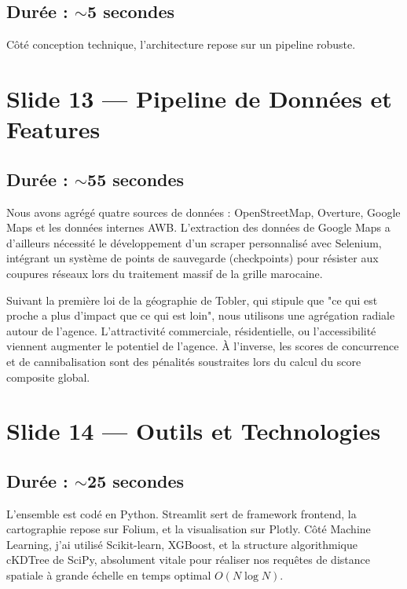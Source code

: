 \documentclass[11pt,a4paper]{article}
\begin{document}
\subsection{Durée : $\sim$5 secondes}
Côté conception technique, l'architecture repose sur un pipeline robuste.

\section{Slide 13 --- Pipeline de Données et Features}
\subsection{Durée : $\sim$55 secondes}
Nous avons agrégé quatre sources de données : OpenStreetMap, Overture, Google Maps et les données internes AWB. L'extraction des données de Google Maps a d'ailleurs nécessité le développement d'un scraper personnalisé avec Selenium, intégrant un système de points de sauvegarde (checkpoints) pour résister aux coupures réseaux lors du traitement massif de la grille marocaine.

Suivant la première loi de la géographie de Tobler, qui stipule que "ce qui est proche a plus d'impact que ce qui est loin", nous utilisons une agrégation radiale autour de l'agence. L'attractivité commerciale, résidentielle, ou l'accessibilité viennent augmenter le potentiel de l'agence. À l'inverse, les scores de concurrence et de cannibalisation sont des pénalités soustraites lors du calcul du score composite global.

\section{Slide 14 --- Outils et Technologies}
\subsection{Durée : $\sim$25 secondes}
L'ensemble est codé en Python. Streamlit sert de framework frontend, la cartographie repose sur Folium, et la visualisation sur Plotly. Côté Machine Learning, j'ai utilisé Scikit-learn, XGBoost, et la structure algorithmique cKDTree de SciPy, absolument vitale pour réaliser nos requêtes de distance spatiale à grande échelle en temps optimal $O(N \log N)$.
\end{document}
